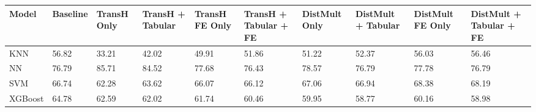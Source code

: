 \begin{tabular}{llllllllll}
\toprule
Model & Baseline & TransH Only & TransH + Tabular & TransH FE Only & TransH + Tabular + FE & DistMult Only & DistMult + Tabular & DistMult FE Only & DistMult + Tabular + FE \\
\midrule
KNN & 56.82 & 33.21 & 42.02 & 49.91 & 51.86 & 51.22 & 52.37 & 56.03 & 56.46 \\
NN & 76.79 & 85.71 & 84.52 & 77.68 & 76.43 & 78.57 & 76.79 & 77.78 & 76.79 \\
SVM & 66.74 & 62.28 & 63.62 & 66.07 & 66.12 & 67.06 & 66.94 & 68.38 & 68.19 \\
XGBoost & 64.78 & 62.59 & 62.02 & 61.74 & 60.46 & 59.95 & 58.77 & 60.16 & 58.98 \\
\bottomrule
\end{tabular}
